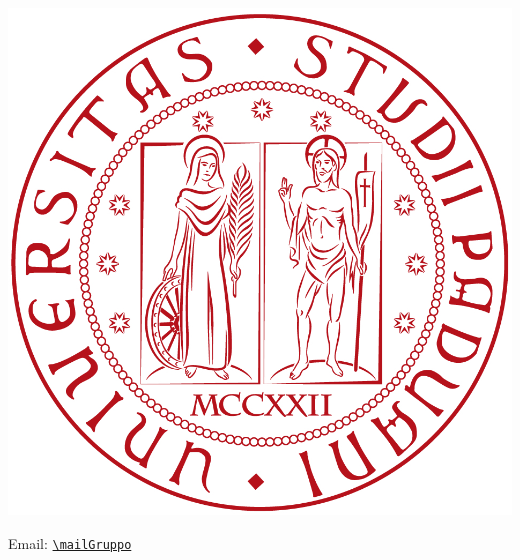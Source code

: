 \thispagestyle{empty}

\begin{titlepage}

	\begin{center}
		\dataUM \\
		\textbf{
			\uni \\
			\cdl \\
			\uniAA \\
		}
		\HRule \\[0.4cm]
				{\LARGE  \bfseries \titoloDocumento}\\[0.4cm]
		\HRule \\[2.5cm]
		

		
		
		\begin{center}
			\includegraphics[scale=0.35]{./sezioni/img/unipd.jpg}
		\end{center}
		Email: 
		\href{mailto:\mailGruppo}{\nolinkurl{\mailGruppo} } \\
		\vspace{3cm}
		


\end{center}
\end{titlepage}
